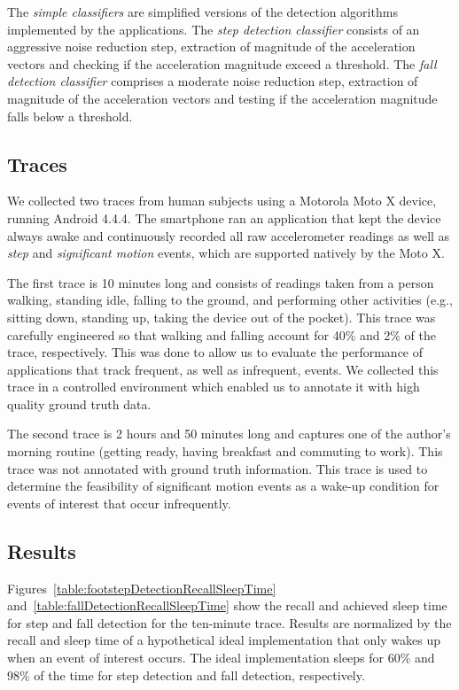 The {\em simple classifiers} are simplified versions of the detection algorithms implemented
by the applications.  The {\em step detection classifier} consists of an aggressive noise 
reduction step, extraction of magnitude of the acceleration vectors and checking if the 
acceleration magnitude exceed a threshold. The {\em fall detection classifier} comprises a 
moderate noise reduction step, extraction of magnitude of the acceleration vectors and testing
if the acceleration magnitude falls below a threshold.

\subsection{Traces}

We collected two traces from human subjects using a Motorola Moto X
device, running Android 4.4.4.  The smartphone ran an application that
kept the device always awake and continuously recorded all raw
accelerometer readings as well as {\em step} and {\em significant motion} 
events, which are supported natively by the Moto X.

The first trace is 10 minutes long and consists of readings taken from
a person walking, standing idle, falling to the ground, and performing
other activities (e.g., sitting down, standing up, taking the device
out of the pocket).  This trace was carefully engineered so that
walking and falling account for 40\% and 2\% of the trace,
respectively.  This was done to allow us to evaluate the performance
of applications that track frequent, as well as infrequent, events.  We
collected this trace in a controlled environment which enabled us to
annotate it with high quality ground truth data.

The second trace is 2 hours and 50 minutes long and captures one of
the author's morning routine (getting ready, having breakfast and
commuting to work).  This trace was not annotated with ground truth
information.  This trace is used to determine the feasibility of 
significant motion events as a wake-up condition for events of
interest that occur infrequently.

\subsection{Results}

Figures~\ref{table:footstepDetectionRecallSleepTime}
and~\ref{table:fallDetectionRecallSleepTime} show the recall and
achieved sleep time for step and fall detection for the ten-minute
trace.  Results are normalized by the recall and sleep time of a
hypothetical ideal implementation that only wakes up when an event of
interest occurs.  The ideal implementation sleeps for 60\% and 98\% of
the time for step detection and fall detection, respectively.

